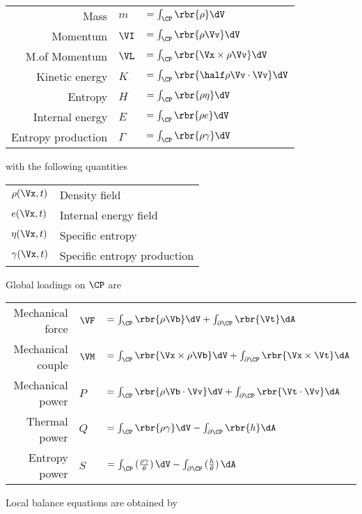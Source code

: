 \documentclass[10pt,landscape]{article}
\begin{document}
\begin{multicols*}{3}
\begin{center}
  \begin{tabular}{r p{0em}<{} l}
    Mass & $m$ & $= \int_\CP\rbr{\rho}\dV$\\[0.8ex]
    Momentum & $\VI$ & $= \int_\CP\rbr{\rho\Vv}\dV$\\[0.8ex]
    M.of Momentum &  $\VL$ & $= \int_\CP\rbr{\Vx\times\rho\Vv}\dV$ \\[0.8ex]
    Kinetic energy & $K$ & $= \int_\CP\rbr{\half\rho\Vv\cdot\Vv}\dV$ \\[0.8ex]
    Entropy & $H$ & $=\int_\CP\rbr{\rho\eta}\dV$ \\[0.8ex]
    Internal energy & $E$ & $=\int_\CP\rbr{\rho e}\dV$ \\[0.8ex]
    Entropy production & $\varGamma$ & $=\int_\CP\rbr{\rho\gamma}\dV$ \\[0.8ex]
  \end{tabular}
\end{center}
with the following quantities
\begin{center}
  \begin{tabular}{l l}
    $\rho(\Vx,t)$ & Density field\\
    $e(\Vx,t)$ & Internal energy field\\
    $\eta(\Vx,t)$ & Specific entropy\\
    $\gamma(\Vx,t)$ & Specific entropy production\\
  \end{tabular}
\end{center}
Global loadings on $\CP$ are
%
\begin{center}
  \begin{tabular}{r p{0em}<{} l}
    Mechanical force & $\VF$ & $= \int_\CP\rbr{\rho\Vb}\dV+\int_{\partial\CP}\rbr{\Vt}\dA$\\[0.8ex]
    Mechanical couple & $\VM$ & $= \int_\CP\rbr{\Vx\times\rho\Vb}\dV+\int_{\partial\CP}\rbr{\Vx\times\Vt}\dA$\\[0.8ex]
    Mechanical power &  $P$ & $= \int_\CP\rbr{\rho\Vb\cdot\Vv}\dV + \int_{\partial\CP}\rbr{\Vt\cdot\Vv}\dA$ \\[0.8ex]
    Thermal power & $Q$ & $= \int_\CP\rbr{\rho\gamma}\dV - \int_{\partial\CP}\rbr{h}\dA$ \\[0.8ex]
    Entropy power & $S$ & $=\int_\CP\,(\frac{\rho\gamma}{\theta})\,\dV - \int_{\partial\CP}\,(\textstyle\frac{h}{\theta})\,\dA$ \\[0.8ex]
  \end{tabular}
\end{center}
Local balance equations are obtained by


\end{multicols*}
\end{document}

